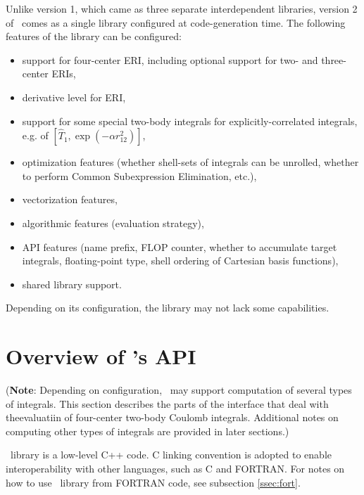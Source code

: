 \documentclass[10pt]{article}
\begin{document}
Unlike version 1, which came as three separate interdependent libraries, version
2 of \LIBINT\ comes as a single library configured at code-generation time.
The following features of the library can be configured:
\begin{itemize}
\item support for four-center ERI, including optional support for two- and
three-center ERIs,
\item derivative level for ERI,
\item support for some special two-body integrals for explicitly-correlated
integrals, e.g. of $[\hat{T}_1,\exp(- \alpha r_{12}^2)]$,
\item optimization features (whether shell-sets of integrals can be unrolled,
whether to perform Common Subexpression Elimination, etc.),
\item vectorization features,
\item algorithmic features (evaluation strategy),
\item API features (name prefix, FLOP counter, whether to accumulate target integrals, floating-point type,
shell ordering of Cartesian basis functions),
\item shared library support.
\end{itemize}
Depending on its configuration, the library may not lack some capabilities.

\section{Overview of \LIBINT 's API}

({\bf Note}: Depending on configuration, \LIBINT\ may support computation of several types of integrals. This section describes
the parts of the interface that deal with theevaluatiin of four-center two-body Coulomb integrals.
Additional notes on computing other types of integrals are provided in later sections.)

\LIBINT\ library is a low-level C++ code. C linking convention is adopted to enable interoperability with other languages, such as C and FORTRAN.
For notes on how to use \LIBINT\ library from FORTRAN code, see subsection
\ref{ssec:fort}.
\end{document}
